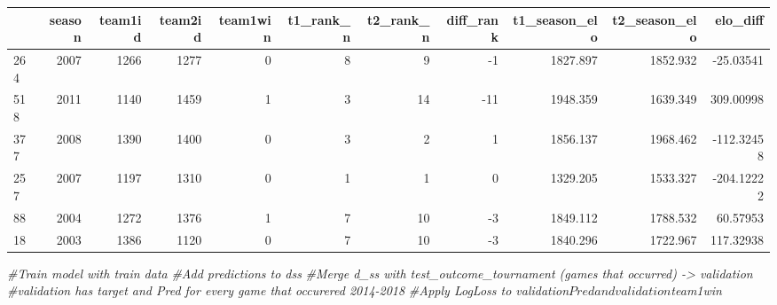 \documentclass[]{article}
\newenvironment{Shaded}{\begin{snugshade}}{\end{snugshade}}
\newcommand{\KeywordTok}[1]{\textcolor[rgb]{0.13,0.29,0.53}{\textbf{#1}}}
\newcommand{\DecValTok}[1]{\textcolor[rgb]{0.00,0.00,0.81}{#1}}
\newcommand{\StringTok}[1]{\textcolor[rgb]{0.31,0.60,0.02}{#1}}
\newcommand{\CommentTok}[1]{\textcolor[rgb]{0.56,0.35,0.01}{\textit{#1}}}
\newcommand{\OtherTok}[1]{\textcolor[rgb]{0.56,0.35,0.01}{#1}}
\newcommand{\OperatorTok}[1]{\textcolor[rgb]{0.81,0.36,0.00}{\textbf{#1}}}
\newcommand{\NormalTok}[1]{#1}
\begin{document}
\begin{Shaded}
\end{Shaded}

\begin{longtable}[]{@{}lrrrrrrrrrr@{}}
\toprule
& season & team1id & team2id & team1win & t1\_rank\_n & t2\_rank\_n &
diff\_rank & t1\_season\_elo & t2\_season\_elo &
elo\_diff\tabularnewline
\midrule
\endhead
264 & 2007 & 1266 & 1277 & 0 & 8 & 9 & -1 & 1827.897 & 1852.932 &
-25.03541\tabularnewline
518 & 2011 & 1140 & 1459 & 1 & 3 & 14 & -11 & 1948.359 & 1639.349 &
309.00998\tabularnewline
377 & 2008 & 1390 & 1400 & 0 & 3 & 2 & 1 & 1856.137 & 1968.462 &
-112.32458\tabularnewline
257 & 2007 & 1197 & 1310 & 0 & 1 & 1 & 0 & 1329.205 & 1533.327 &
-204.12222\tabularnewline
88 & 2004 & 1272 & 1376 & 1 & 7 & 10 & -3 & 1849.112 & 1788.532 &
60.57953\tabularnewline
18 & 2003 & 1386 & 1120 & 0 & 7 & 10 & -3 & 1840.296 & 1722.967 &
117.32938\tabularnewline
\bottomrule
\end{longtable}

\begin{Shaded}
\begin{Highlighting}[]
\CommentTok{#Train model with train data}
\CommentTok{#Add predictions to dss}
\CommentTok{#Merge d_ss with test_outcome_tournament (games that occurred) -> validation}
\CommentTok{#validation has target and Pred for every game that occurered 2014-2018}
\CommentTok{#Apply LogLoss to validation$Pred and validation$team1win}
\end{Highlighting}
\end{Shaded}
\end{document}
